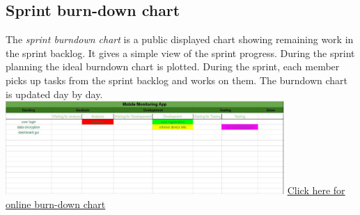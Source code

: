 \documentclass[hidelinks, 12pt, oneside]{article}
\begin{document}
 	\subsection{Sprint burn-down chart}
	The \emph{sprint burndown chart} is a public displayed chart showing remaining work in the sprint backlog. It gives a simple view of the sprint progress. During the sprint planning 
	the ideal burndown chart is plotted. During the sprint, each member picks up tasks from the sprint backlog and works on them. The burndown chart is updated day by day.\newline\newline
	\includegraphics[width=400px]{img/burndown.jpg}\newline
	\href{https://docs.google.com/spreadsheets/u/3/d/1Qa7quxQTuZJmRNlt84Dl4iSXsZh-cYIeFgFJ_hzmv5k/edit?usp=drive_web}{Click here for online burn-down chart}\newline
 	
\end{document}

